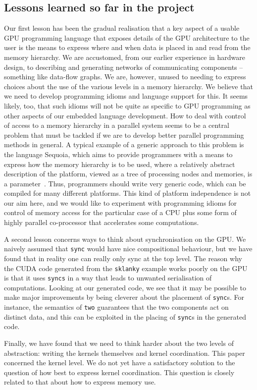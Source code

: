 \subsection{Lessons learned so far in the project}
Our first lesson has been the gradual realisation that a key aspect of a usable
GPU programming language that exposes details of the GPU architecture to the user is the means to express where and when data is placed in and
read from the memory hierarchy.
We are accustomed, from our earlier experience in hardware design, to describing
and generating networks of communicating components -- something like data-flow graphs. We are, however, unused to needing to express choices about the use
of the various levels in a memory hierarchy. We believe that we need to develop programming idioms and language support for this. It seems likely, too, that such idioms will not be quite as specific to GPU programming as other aspects of our embedded language development. How to deal with control of access to
a memory hierarchy in a parallel system seems to be a central problem that must be tackled if we are to develop better parallel programming methods in general.
A typical example of a generic approach to this problem is
the language Sequoia, which aims to provide programmers with a means
to express how the memory hierarchy is to be used, where a relatively abstract description of
the platform, viewed as a tree of processing nodes and memories, is a parameter~\cite{Sequoia}. Thus, programmers should write very generic code, which can be compiled for many different platforms. This kind of platform independence is not our aim here, and we would like to experiment with programming idioms for control of memory access for the particular case of a CPU plus some form of highly parallel co-processor that accelerates some computations.

A second lesson concerns ways to think about synchronisation on the GPU. We naively assumed that {\tt sync} would have nice compositional behaviour, but we have found that in reality one can really only sync at the top level.
The reason why the CUDA code generated from the {\tt sklanky} example works poorly on the GPU is that it uses {\tt syncs} in a way that leads to unwanted
serialisation of computations. Looking at our generated code, we see that it may be possible to make major improvements by being cleverer about the placement
of {\tt sync}s. For instance, the semantics of {\tt two} guarantees that the two components act on distinct data, and this can be exploited in the placing of {\tt sync}s in the generated code.

Finally, we have found that we need to think harder about the two levels of
abstraction: writing the kernels themselves and kernel coordination. This paper concerned the kernel level. We do not yet have a satisfactory solution to the question of how best to express kernel coordination. This question is closely related to that about how to express memory use.






